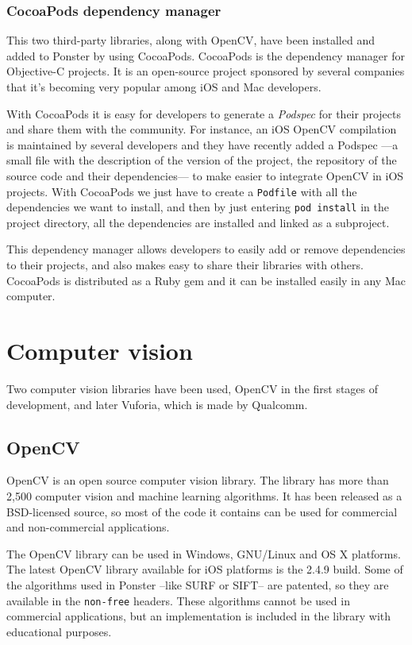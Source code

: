 \subsubsection{CocoaPods dependency manager}
This two third-party libraries, along with OpenCV, have been installed and added to
Ponster by using CocoaPods. CocoaPods is the dependency manager for Objective-C
projects\cite{cocoapods}. It is an open-source project sponsored by several
companies that it's becoming very popular among iOS and Mac developers.

With CocoaPods it is easy for developers to generate a \emph{Podspec} for their
projects and share them with the community. For instance, an iOS OpenCV compilation
is maintained by several developers and they have recently added a Podspec ---a small
file with the description of the version of the project, the repository of the
source code and their dependencies--- to make easier to integrate OpenCV in iOS
projects. With CocoaPods we just have to create a \texttt{Podfile} with all the
dependencies we want to install, and then by just entering \texttt{pod install} in
the project directory, all the dependencies are installed and linked as a
subproject.

This dependency manager allows developers to easily add or remove dependencies to
their projects, and also makes easy to share their libraries with others. CocoaPods
is distributed as a Ruby gem and it can be installed easily in any Mac computer.

\section{Computer vision}
Two computer vision libraries have been used, OpenCV in the first stages of
development, and later Vuforia, which is made by Qualcomm. 

\subsection{OpenCV}
OpenCV is an open source computer vision library\cite{opencv}. The library has
more than 2,500 computer vision and machine learning algorithms. It has been
released as a BSD-licensed source, so most of the code it contains can be used for
commercial and non-commercial applications.

The OpenCV library can be used in Windows, GNU/Linux and OS X platforms. The
latest OpenCV library available for iOS platforms is the 2.4.9
build\cite{opencvpod}. Some of the algorithms used in Ponster --like SURF or SIFT--
are patented, so they are available in the \texttt{non-free} headers. These
algorithms cannot be used in commercial applications, but an implementation is
included in the library with educational purposes. 

